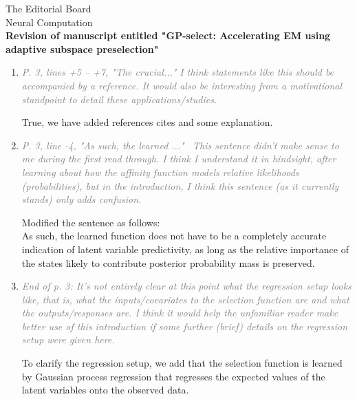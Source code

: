 \documentclass[10pt]{letter}
\newcommand{\rvr}[1]{\textcolor{gray}{#1}}
\newcommand{\rev}[1]{\textcolor{blue}{#1}}
\begin{document}
\begin{letter}{
The Editorial Board\\
Neural Computation\\
\vspace{10mm}
\textbf{Revision of manuscript entitled "GP-select: Accelerating EM using adaptive
subspace preselection"}
}
\begin{enumerate}[topsep=3pt,itemsep=2ex,partopsep=1ex,parsep=1ex]
We have added illustrative examples to the introduction in order to provide an early intuition for the used approach. We also motivate sparsity with two examples in Sec. 5.1 as suggested, provided more explanation to Sec. 5.3, and added pointers to potential application domains / typical tasks in introduction and Sec. 5.1. We agree that providing such examples and their task contexts makes our motivation clearer, and believe that our changes have improved the manuscript accordingly.
    
    \item \rvr{\emph{P. 3, lines +5 -- +7, "The crucial..."  I think statements like this should be accompanied by a reference. It would also be interesting from a motivational standpoint to detail these applications/studies.}}

True, we have added references cites and some explanation.

    \item \rvr{\emph{P. 3, line -4, "As such, the learned ..."  This sentence didn’t make sense to me during the first read through. I think I understand it in hindsight, after learning about how the affinity function models relative likelihoods (probabilities), but in the introduction, I think this sentence (as it currently stands) only adds confusion.}}

Modified the sentence as follows: \\
As such, the learned function does not have to be a completely accurate
indication of latent variable predictivity, as long as the relative importance of the states
likely to contribute posterior probability mass is preserved.

    \item \rvr{\emph{End of p. 3: It's not entirely clear at this point what the regression setup looks like, that is, what the inputs/covariates to the selection function are and what the outputs/responses are. I think it would help the unfamiliar reader make better use of this introduction if some further (brief) details on the regression setup were given here.}}

To clarify the regression setup, we add that the selection function is learned by Gaussian process regression that regresses the expected values of the latent variables onto the observed data.


\end{enumerate}
\end{letter}
\end{document}
